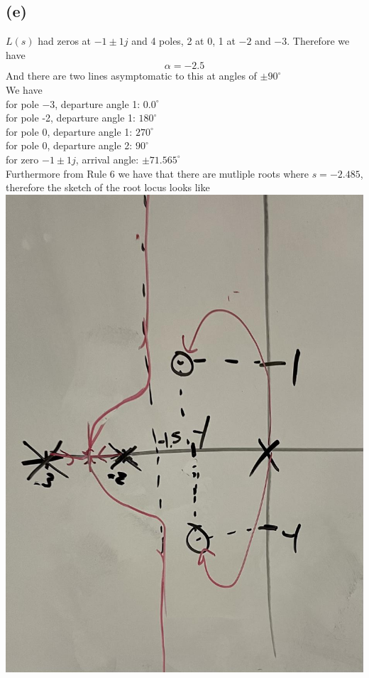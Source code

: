 \documentclass[12pt]{article}
\begin{document}
\subsection*{(e)}
$L(s)$ had zeros at $-1\pm1j$ and 4 poles, 2 at 0, 1 at $-2$ and $-3$. Therefore we have
$$\alpha=-2.5$$
And there are two lines asymptomatic to this at angles of $\pm90^{\circ}$
\\
We have
\\for pole $-3$, departure angle 1: $0.0^{\circ}$
\\for pole -2, departure angle 1: $180^{\circ}$
\\for pole 0, departure angle 1: $270^{\circ}$
\\for pole 0, departure angle 2: $90^{\circ}$
\\for zero $-1\pm1j$, arrival angle: $\pm71.565^{\circ}$\\
Furthermore from Rule 6 we have that there are mutliple roots where $s=-2.485$, therefore the sketch of the root locus looks like
\\
\includegraphics[scale=.15]{Problem2Sketch2.jpg}
\end{document}
